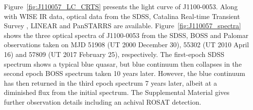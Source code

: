 \documentclass{nature}
\begin{document}
Figure~\ref{fig:J110057_LC_CRTS} presents the light curve of
J1100-0053.  Along with WISE IR data, optical data from the SDSS,
Catalina Real-time Transient Survey \citep[CRTS;][]{Drake2009,
Mahabal2011}, LINEAR \citep{Sesar2011} and PanSTARRS
\citep{Kaiser2010, Stubbs2010, Tonry2012, Magnier2013} are available.
Figure~\ref{fig:J110057_spectra} shows the three optical spectra of
J1100-0053 from the SDSS, BOSS and Palomar observations taken on MJD
51908 (UT 2000 December 30), 55302 (UT 2010 April 16) and 57809 (UT
2017 February 25), respectively.  The first-epoch SDSS spectrum shows
a typical blue quasar, but blue continuum then collapses in the second
epoch BOSS spectrum taken 10 years later. However, the blue continuum
has then returned in the third epoch spectrum 7 years later, albeit at
a diminished flux from the initial spectrum.  The Supplemental
Material gives further observation details including an achival ROSAT
detection.
\end{document}
